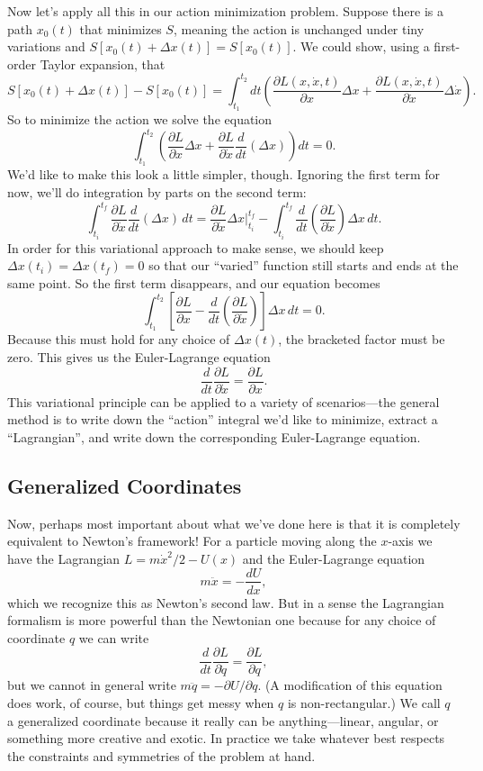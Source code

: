 \documentclass[../p111main.tex]{subfiles}
\begin{document}
Now let's apply all this in our action minimization problem.
Suppose there is a path $x_0(t)$ that minimizes $S$, meaning the action is unchanged under tiny variations and $S[x_0(t) + \Delta x(t)] = S[x_0(t)]$.
We could show, using a first-order Taylor expansion, that
\[ S[x_0(t) + \Delta x(t)] - S[x_0(t)] = \int_{t_1}^{t_2} dt \left( \frac{\partial L(x, \dot x, t)}{\partial x} \Delta x + \frac{\partial L(x, \dot x, t)}{\partial \dot x} \Delta \dot x \right). \]
So to minimize the action we solve the equation
\[ \int_{t_1}^{t_2} \left( \frac{\partial L}{\partial x} \Delta x + \frac{\partial L}{\partial \dot x} \frac{d}{dt} (\Delta x) \right) dt = 0. \]
We'd like to make this look a little simpler, though.
Ignoring the first term for now, we'll do integration by parts on the second term:
\[ \int_{t_i}^{t_f} \frac{\partial L}{\partial \dot x} \frac{d}{dt} (\Delta x) \,dt = \frac{\partial L}{\partial \dot x} \Delta x \Bigg|_{t_i}^{t_f} - \int_{t_i}^{t_f} \frac{d}{dt} \left( \frac{\partial L}{\partial \dot x} \right) \Delta x \,dt. \]
In order for this variational approach to make sense, we should keep $\Delta x(t_i) = \Delta x(t_f) = 0$ so that our ``varied'' function still starts and ends at the same point.
So the first term disappears, and our equation becomes
\[ \int_{t_1}^{t_2} \left[ \frac{\partial L}{\partial x} - \frac{d}{dt} \left( \frac{\partial L}{\partial \dot x} \right) \right] \Delta x \,dt = 0. \]
Because this must hold for any choice of $\Delta x(t)$, the bracketed factor must be zero.
This gives us the Euler-Lagrange equation
\[ \frac{d}{dt} \frac{\partial L}{\partial \dot x} = \frac{\partial L}{\partial x}. \]
This variational principle can be applied to a variety of scenarios---the general method is to write down the ``action'' integral we'd like to minimize, extract a ``Lagrangian'', and write down the corresponding Euler-Lagrange equation.

\subsection*{Generalized Coordinates}
Now, perhaps most important about what we've done here is that it is completely equivalent to Newton's framework!
For a particle moving along the $x$-axis we have the Lagrangian $L = m \dot x^2 / 2 - U(x)$ and the Euler-Lagrange equation
\[ m \ddot x = -\frac{dU}{dx}, \]
which we recognize this as Newton's second law.
But in a sense the Lagrangian formalism is more powerful than the Newtonian one because for any choice of coordinate $q$ we can write
\[ \frac{d}{dt} \frac{\partial L}{\partial \dot q} = \frac{\partial L}{\partial q}, \]
but we cannot in general write $m \ddot q = -\partial U / \partial q$.
(A modification of this equation does work, of course, but things get messy when $q$ is non-rectangular.)
We call $q$ a generalized coordinate because it really can be anything---linear, angular, or something more creative and exotic.
In practice we take whatever best respects the constraints and symmetries of the problem at hand.
\end{document}
